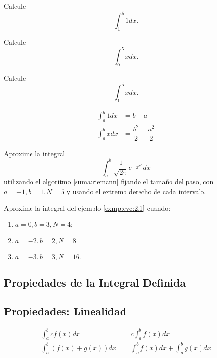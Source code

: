 	\begin{resuelto}
		Calcule
		$$\int_{1}^{5}1dx.$$
	\end{resuelto}




	\begin{resuelto}
		\label{ayr:exmp:23.3a}
		Calcule
		$$\int_{0}^{5}xdx.$$
	\end{resuelto}




	\begin{resuelto}
		\label{ayr:exmp:23.3b}
		Calcule
		$$\int_{1}^{5}xdx.$$
	\end{resuelto}




	\begin{proposicion}
		\begin{align}
			\label{ayr:23.2.1}
			\int_{a}^{b}1dx&=b-a\\
			\label{ayr:23.2.2}
			\int_{a}^{b}xdx&=\dfrac{b^{2}}{2}-\dfrac{a^{2}}{2}
		\end{align}

	\end{proposicion}




	\begin{resuelto}
		\label{exmp:evc:2.1}
		Aproxime la integral
		$$
		\int_{a}^{b} \dfrac{1}{\sqrt{2\pi}}e^{-\frac{1}{2}x^{2}}dx
		$$
		utilizando el algoritmo \ref{suma:riemann} fijando el tamaño del paso, con $a=-1, b=1, N=5$ y usando el extremo derecho de cada intervalo.
	\end{resuelto}



	\begin{resuelto}
		Aproxime la integral del ejemplo \ref{exmp:evc:2.1} cuando:
		\begin{enumerate}
			\item $a=0, b=3, N=4;$
			\item $a=-2, b=2, N=8;$
			\item $a=-3, b=3, N=16.$
		\end{enumerate}

	\end{resuelto}




\subsection{Propiedades de la Integral Definida}


	\subsection{Propiedades: Linealidad}
	\begin{align}
		\label{ayr:23.3}
		\int_{a}^{b} c f(x)dx&=c \int_{a}^{b}f(x)dx \\
		\label{ayr:23.5}
		\int_{a}^{b} \left( f(x)+g(x) \right)dx&= \int_{a}^{b}f(x)dx + \int_{a}^{b}g(x)dx
	\end{align}




